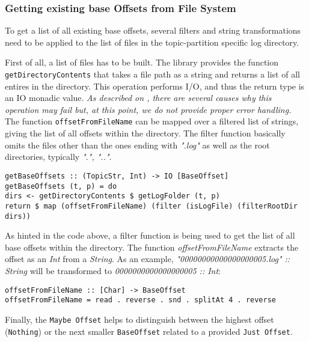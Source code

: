 \subsubsection{Getting existing base Offsets from File System}
To get a list of all existing base offsets, several filters and string transformations 
need to be applied to the list of files in the topic-partition specific log directory. 

First of all, a list of files has to be
built. The library
provides the function \lstinline{getDirectoryContents} that takes a file path as a
string and returns a list of all entires in the directory. This operation
performs I/O, and thus the return type is an IO monadic value. \textit{As
described on
,
there are several causes why this operation may fail but, at this point, we do
not provide proper error handling.}
The function \lstinline{offsetFromFileName} can be mapped over a filtered list of
strings, giving the list of all offsets within the directory. The
filter function basically omits the files other than the ones ending with
\textit{".log"} as well as the root directories, typically \textit{".", ".."}.

\begin{lstlisting}[caption={Determining all base offsets for given topic and partition}]
getBaseOffsets :: (TopicStr, Int) -> IO [BaseOffset]
getBaseOffsets (t, p) = do
dirs <- getDirectoryContents $ getLogFolder (t, p)
return $ map (offsetFromFileName) (filter (isLogFile) (filterRootDir dirs))
\end{lstlisting}

As hinted in the code above, a filter function is being used to get the list of
all base offsets within the directory. The function \textit{offsetFromFileName}
extracts the offset as an \textit{Int} from a \textit{String}. As an example,
\textit{"00000000000000000005.log" :: String } will be transformed to
\textit{0000000000000000005 :: Int}:

\begin{lstlisting}[caption={Get numeric value (offset) from given string (filename)}]
offsetFromFileName :: [Char] -> BaseOffset
offsetFromFileName = read . reverse . snd . splitAt 4 . reverse
\end{lstlisting}

Finally, the \lstinline{Maybe Offset} helps to distinguish between the highest offset
(\lstinline{Nothing}) or the next smaller \lstinline{BaseOffset} related to a provided
\lstinline{Just Offset}. 

